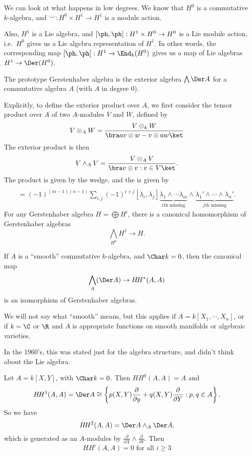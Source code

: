 \documentclass[a4paper]{article}
\newcommand\HH{H\!H}
\begin{document}
We can look at what happens in low degrees. We know that $H^0$ is a commutative $k$-algebra, and $\smile: H^0 \times H^1 \to H^1$ is a module action.

Also, $H^1$ is a Lie algebra, and $[\ph, \ph]: H^1 \times H^0 \to H^0$ is a Lie module action, i.e.\ $H^0$ gives us a Lie algebra representation of $H^1$. In other words, the corresponding map $[\ph, \ph]: H^1 \to \End_k(H^0)$ gives us a map of Lie algebras $H^1 \to \Der(H^0)$.

The prototype Gerstenhaber algebra is the exterior algebra $\bigwedge \Der A$ for a commutative algebra $A$ (with $A$ in degree $0$).

Explicitly, to define the exterior product over $A$, we first consider the tensor product over $A$ of two $A$-modules $V$ and $W$, defined by
\[
  V \otimes_A W = \frac{V \otimes_k W}{\bra av \otimes w - v \otimes aw\ket}
\]
The exterior product is then
\[
  V \wedge_A V = \frac{V \otimes_A V}{\bra v \otimes v: v \in V\ket}.
\]
The product is given by the wedge, and the  is given by
\begin{multline*}
  [\lambda_1 \wedge \cdots \wedge \lambda_m, \lambda_1' \wedge \cdots \wedge \lambda_n'] \\
  = (-1)^{(m - 1)(n - 1)} \sum_{i, j} (-1)^{i + j} [\lambda_i, \lambda_j] \underbrace{\lambda_1 \wedge \cdots \lambda_m}_{\text{$i$th missing}} \wedge \underbrace{\lambda_1' \wedge \cdots \wedge \lambda_n'}_{\text{$j$th missing}}.
\end{multline*}
For any Gerstenhaber algebra $H = \bigoplus H^i$, there is a canonical homomorphism of Gerstenhaber algebras
\[
  \bigwedge_{H^0}H^1 \to H.
\]
\begin{thm}
  If $A$ is a ``smooth'' commutative $k$-algebra, and $\Char k = 0$, then the canonical map
  \[
    \bigwedge_A (\Der A) \to \HH^*(A, A)
  \]
  is an isomorphism of Gerstenhaber algebras.
\end{thm}
We will not say what ``smooth'' means, but this applies if $A = k[X_1, \cdots, X_n]$, or if $k = \C$ or $\R$ and $A$ is appropriate functions on smooth manifolds or algebraic varieties.

In the 1960's, this was stated just for the algebra structure, and didn't think about the Lie algebra.

\begin{eg}
  Let $A = k[X, Y]$, with $\Char k = 0$. Then $\HH^0(A, A) = A$ and
  \[
    \HH^1(A, A) = \Der A \cong \left\{p(X, Y) \frac{\partial}{\partial y} + q(X, Y) \frac{\partial}{\partial Y}: p, q \in A\right\}.
  \]
  So we have
  \[
    \HH^2(A, A) = \Der A \wedge_A \Der A,
  \]
  which is generated as an $A$-modules by $\frac{\partial}{\partial X} \wedge \frac{\partial}{\partial Y}$. Then
  \[
    \HH^i(A, A) = 0\text{ for all }i \geq 3
  \]
\end{eg}
\end{document}
